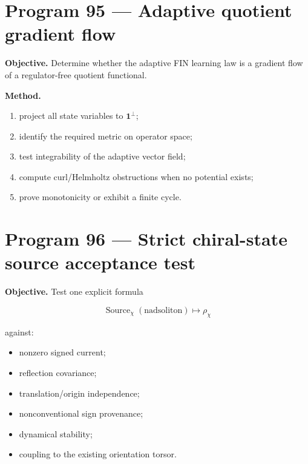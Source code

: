 \documentclass[11pt,a4paper,openany]{report}
\begin{document}
\section{Program 95 --- Adaptive quotient gradient flow}

\textbf{Objective.} Determine whether the adaptive FIN learning law is a gradient flow of a regulator-free quotient functional.

\textbf{Method.}

\begin{enumerate}
\item 
project all state variables to \(\mathbf1^\perp\);

\item 
identify the required metric on operator space;

\item 
test integrability of the adaptive vector field;

\item 
compute curl/\allowbreak{}Helmholtz obstructions when no potential exists;

\item 
prove monotonicity or exhibit a finite cycle.

\end{enumerate}

\section{Program 96 --- Strict chiral-state source acceptance test}

\textbf{Objective.} Test one explicit formula

\[
\operatorname{Source}_{\chi}(\text{nadsoliton})
\longmapsto
\rho_{\chi}
\]

against:

\begin{itemize}
\item 
nonzero signed current;

\item 
reflection covariance;

\item 
translation/\allowbreak{}origin independence;

\item 
nonconventional sign provenance;

\item 
dynamical stability;

\item 
coupling to the existing orientation torsor.

\end{itemize}
\end{document}
